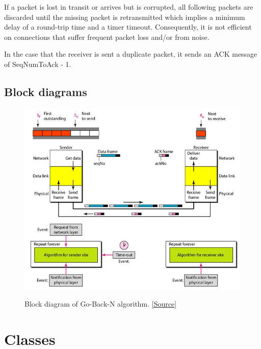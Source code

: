 \documentclass[12pt]{article}
\begin{document}
If a packet is lost in transit or arrives but is corrupted, all following packets are discarded until the missing packet is retransmitted which implies a minimum delay of a round-trip time and a timer timeout. Consequently, it is not efficient on connections that suffer frequent packet loss and/or from noise.

In the case that the receiver is sent a duplicate packet, it sends an ACK message of SeqNumToAck - 1.


\newpage
\subsection{Block diagrams}

\begin{figure}[h!]
	\caption{Block diagram of Go-Back-N algorithm. \href{http://www.myreadingroom.co.in/notes-and-studymaterial/68-dcn/813-go-back-n-arq-protocol.html}{[Source]}}
	\centering
	\includegraphics[width=\linewidth]{gbn.jpg}
	\label{fig:fig1}
\end{figure}

\section{Classes}
\end{document}

